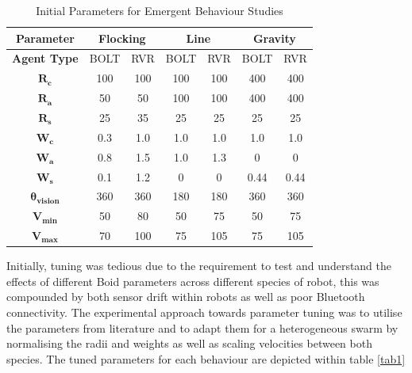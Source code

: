 \documentclass[conference]{IEEEtran}
\begin{document}
\begin{table}[h]
\centering
\caption{Initial Parameters for Emergent Behaviour Studies}
\label{tab0}
\begin{tabular}{|c|c|c|c|c|c|c|}
\hline
\textbf{Parameter}     & \multicolumn{2}{|c|}{\textbf{Flocking}} & \multicolumn{2}{|c|}{\textbf{Line}} & \multicolumn{2}{|c|}{\textbf{Gravity}} \\  \hline
\textbf{Agent Type}    & BOLT               & RVR              & BOLT             & RVR            & BOLT              & RVR              \\ \hline
$\mathbf{R_c}$         & 100                & 100              & 100              & 100            & 400               & 400              \\ \hline
$\mathbf{R_a}$         & 50                & 50               & 100              & 100            & 400               & 400              \\ \hline
$\mathbf{R_s}$         & 25                 & 35               & 25               & 25             & 25                & 25               \\ \hline
$\mathbf{W_c}$         & 0.3                & 1.0              & 1.0              & 1.0            & 1.0               & 1.0              \\ \hline
$\mathbf{W_a}$         & 0.8                & 1.5              & 1.0              & 1.3            & 0                 & 0                \\ \hline
$\mathbf{W_s}$         & 0.1                & 1.2              & 0                & 0              & 0.44              & 0.44             \\ \hline
$\mathbf{\theta_{vision}}$ & 360            & 360              & 180              & 180            & 360               & 360              \\ \hline
$\mathbf{V_{min}}$     & 50                 & 80               & 50               & 75             & 50                & 75               \\ \hline
$\mathbf{V_{max}}$     & 70                & 100              & 75               & 105            & 75                & 105 \\ \hline             
\end{tabular}
\end{table}

Initially, tuning was tedious due to the requirement to test and understand the effects of different Boid parameters across different species of robot, this was compounded by both sensor drift within robots as well as poor Bluetooth connectivity. The experimental approach towards parameter tuning was to utilise the parameters from literature and to adapt them for a heterogeneous swarm by normalising the radii and weights as well as scaling velocities between both species. The tuned parameters for each behaviour are depicted within table \ref{tab1}
\end{document}
